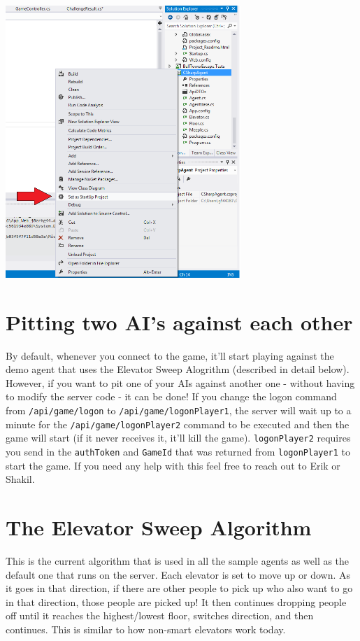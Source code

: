 \documentclass{article}
\begin{document}
\includegraphics[width=3.5in]{set-as-startup.png}

\section*{Pitting two AI's against each other}
By default, whenever you connect to the game, it'll start playing against the demo agent that uses the Elevator Sweep Alogrithm (described in detail below). However, if you want to pit one of your AIs against another one - without having to modify the server code - it can be done! If you change the logon command from \verb|/api/game/logon| to \verb|/api/game/logonPlayer1|, the server will wait up to a minute for the \verb|/api/game/logonPlayer2| command to be executed and then the game will start (if it never receives it, it'll kill the game). \verb|logonPlayer2| requires you send in the \verb|authToken| and \verb|GameId| that was returned from \verb|logonPlayer1| to start the game. If you need any help with this feel free to reach out to Erik or Shakil.

\newpage
\section*{The Elevator Sweep Algorithm}
This is the current algorithm that is used in all the sample agents as well as the default one that runs on the server. Each elevator is set to move up or down. As it goes in that direction, if there are other people to pick up who also want to go in that direction, those people are picked up! It then continues dropping people off until it reaches the highest/lowest floor, switches direction, and then continues. This is similar to how non-smart elevators work today.
\end{document}
